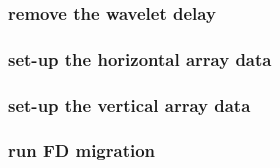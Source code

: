 \begin{frame}  \end{frame}
\begin{frame}  \end{frame}
\begin{frame}  \end{frame}
\begin{frame}  \end{frame}
\begin{frame}  \end{frame}
\begin{frame}  \end{frame}

\begin{frame} \frametitle{remove the wavelet delay}

\end{frame}
\cwpnote{}

\begin{frame} \frametitle{set-up the horizontal array data}

\end{frame}
\cwpnote{}

\begin{frame}  \end{frame}
\begin{frame}  \end{frame}

\begin{frame} \frametitle{set-up the vertical array data}

\end{frame}
\cwpnote{}

\begin{frame}  \end{frame}
\begin{frame}  \end{frame}

\begin{frame} \frametitle{run FD migration}

\end{frame}
\cwpnote{}

